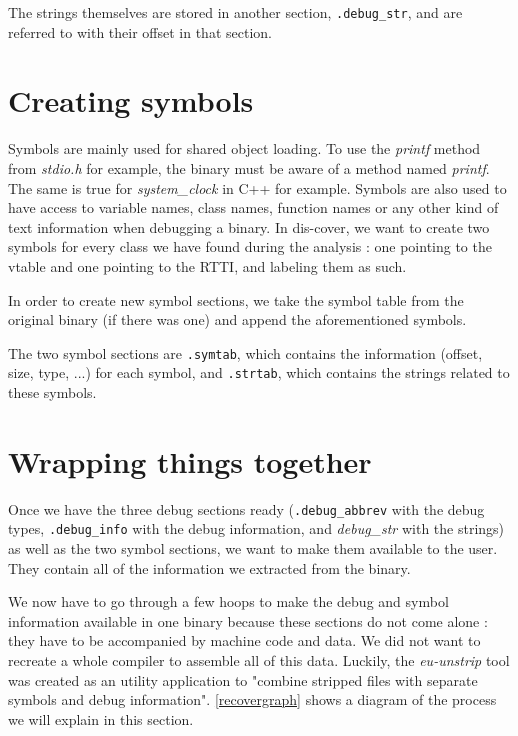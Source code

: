 \documentclass[a4paper,11pt,oneside]{report}
\begin{document}
The strings themselves are stored in another section, \texttt{.debug\_str}, and 
are referred to with their offset in that section.


\section{Creating symbols}

Symbols are mainly used for shared object loading. To use the \emph{printf}
method from \emph{stdio.h} for example, the binary must be aware of a
method named \emph{printf}. The same is true for
\emph{system\_clock} in C++ for example.
Symbols are also used to have access to variable names, class names, function
names or any other kind of text information when debugging a binary.
In dis-cover, we want to create two symbols for every class we have found
during the analysis : one pointing to the vtable and one pointing to the RTTI,
and labeling them as such.

In order to create new symbol sections, we take the symbol table from the 
original binary (if there was one) and append the aforementioned symbols.

The two symbol sections are \texttt{.symtab}, which contains the information 
(offset, size, type, ...) for each symbol, and \texttt{.strtab}, which contains 
the strings related to these symbols.


\section{Wrapping things together}
\label{wrappingimplementation}

Once we have the three debug sections ready
(\texttt{.debug\_abbrev} with the debug types, \texttt{.debug\_info} with the 
debug information, and \emph{debug\_str} with the strings)
as well as the two symbol sections, we want to make them available to the user.
They contain all of the information we extracted from the binary.

We now have to go through a few hoops to make the debug and symbol information
available in one binary because these sections do not come alone : they have to
be accompanied by machine code and data.
We did not want to recreate a whole compiler to assemble all of this data.
Luckily, the \emph{eu-unstrip} tool was created as an utility application
to "combine stripped files with separate symbols and debug information".
\autoref{recovergraph} shows a diagram of the process we will explain in this
section.
\end{document}

